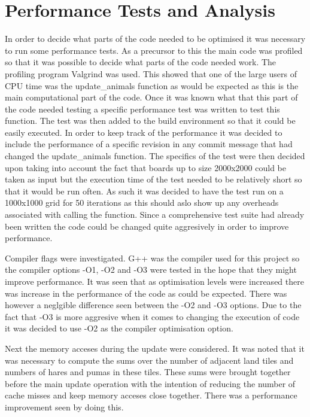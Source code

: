 \section{Performance Tests and Analysis}
In order to decide what parts of the code needed to be optimised it was necessary to run some performance tests.
As a precursor to this the main code was profiled so that it was possible to decide what parts of the code needed work.
The profiling program Valgrind was used.
This showed that one of the large users of CPU time was the update\_animals function as would be expected as this is the main computational part of the code.
Once it was known what that this part of the code needed testing a specific performance test was written to test this function.
The test was then added to the build environment so that it could be easily executed.
In order to keep track of the performance it was decided to include the performance of a specific revision in any commit message that had changed the update\_animals function.
The specifics of the test were then decided upon taking into account the fact that boards up to size 2000x2000 could be taken as input but the execution time of the test needed to be relatively short so that it would be run often.
As such it was decided to have the test run on a 1000x1000 grid for 50 iterations as this should aslo show up any overheads associated with calling the function.
Since a comprehensive test suite had already been written the code could be changed quite aggresively in order to improve performance.

Compiler flags were investigated.
G++ was the compiler used for this project so the compiler options -O1, -O2 and -O3 were tested in the hope that they might improve performance.
It was seen that as optimisation levels were increased there was increase in the performance of the code as could be expected.
There was however a neglgible difference seen between the -O2 and -O3 options.
Due to the fact that -O3 is more aggresive when it comes to changing the execution of code it was decided to use -O2 as the compiler optimisation option.

Next the memory acceses during the update were considered.
It was noted that it was necessary to compute the sums over the number of adjacent land tiles and numbers of hares and pumas in these tiles.
These sums were brought together before the main update operation with the intention of reducing the number of cache misses and keep memory acceses close together.
There was a performance improvement seen by doing this.

